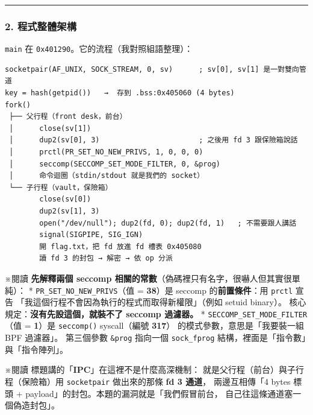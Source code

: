 \documentclass[10pt,a4paper]{article}
\renewenvironment{quote}{%
  \begin{mdframed}[linewidth=0pt,innerleftmargin=0pt,innerrightmargin=0pt,
    innerbottommargin=0pt,innertopmargin=0pt,skipabove=0.55em,skipbelow=0.55em,
    leftmargin=0.9em,rightmargin=0.4em,startcode={\color{quotebar}\vrule width 2.6pt},%
    endcode={}]%
  \itshape\color{black}%
}{%
  \end{mdframed}%
}
\begin{document}
\begin{center}\rule{0.5\linewidth}{0.5pt}\end{center}

\subsubsection{2.
程式整體架構}\label{ux7a0bux5f0fux6574ux9ad4ux67b6ux69cb}

\texttt{main} 在 \texttt{0x401290}。它的流程（我對照組語整理）：

\begin{Verbatim}[breaklines=true,breakanywhere=true,breakautoindent=false,fontsize=\fontsize{7.0}{9.5}\selectfont]
socketpair(AF_UNIX, SOCK_STREAM, 0, sv)      ; sv[0], sv[1] 是一對雙向管道
key = hash(getpid())   →  存到 .bss:0x405060 (4 bytes)
fork()
 ├── 父行程（front desk，前台）
 │      close(sv[1])
 │      dup2(sv[0], 3)                       ; 之後用 fd 3 跟保險箱說話
 │      prctl(PR_SET_NO_NEW_PRIVS, 1, 0, 0, 0)
 │      seccomp(SECCOMP_SET_MODE_FILTER, 0, &prog)
 │      命令迴圈（stdin/stdout 就是我們的 socket）
 └── 子行程（vault，保險箱）
        close(sv[0])
        dup2(sv[1], 3)
        open("/dev/null"); dup2(fd, 0); dup2(fd, 1)   ; 不需要跟人講話
        signal(SIGPIPE, SIG_IGN)
        開 flag.txt，把 fd 放進 fd 槽表 0x405080
        讀 fd 3 的封包 → 解密 → 依 op 分派
\end{Verbatim}

\begin{quote}
※閱讀 \textbf{先解釋兩個 seccomp
相關的常數}（偽碼裡只有名字，很嚇人但其實很單純）： *
\texttt{PR\_\allowbreak{}SET\_\allowbreak{}NO\_\allowbreak{}NEW\_\allowbreak{}PRIVS}（值 = \textbf{38}）是 seccomp
的\textbf{前置條件}：用 \texttt{prctl} 宣告
「我這個行程不會因為執行的程式而取得新權限」（例如 setuid binary）。
核心規定：\textbf{沒有先設這個，就裝不了 seccomp 過濾器。} *
\texttt{SECCOMP\_\allowbreak{}SET\_\allowbreak{}MODE\_\allowbreak{}FILTER}（值 = \textbf{1}）是
\texttt{seccomp()} syscall（編號 \textbf{317}）
的模式參數，意思是「我要裝一組 BPF 過濾器」。 第三個參數 \texttt{\&\allowbreak{}prog}
指向一個 \texttt{sock\_\allowbreak{}fprog} 結構，裡面是「指令數」與「指令陣列」。
\end{quote}

\begin{quote}
※閱讀 標題講的「\textbf{IPC}」在這裡不是什麼高深機制：
就是父行程（前台）與子行程（保險箱）用 \texttt{socketpair} 做出來的那條
\textbf{fd 3 通道}， 兩邊互相傳「4 bytes 標頭 +
payload」的封包。本題的漏洞就是「我們假冒前台，
自己往這條通道塞一個偽造封包」。
\end{quote}
\end{document}
